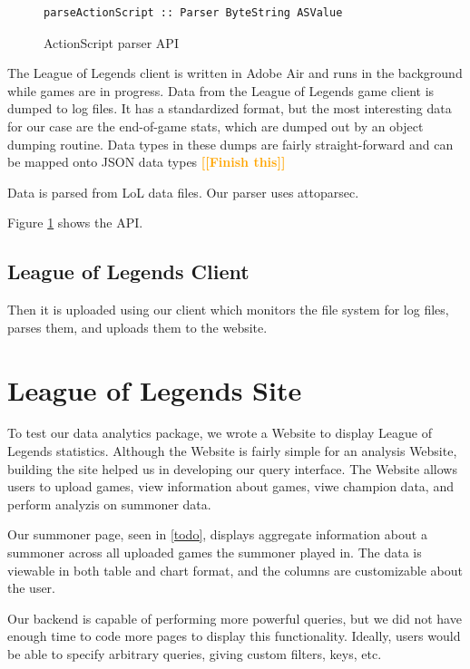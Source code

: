 \documentclass{chi2009}
\newcommand{\todo}[1]{\textsf{\textbf{\textcolor{Orange}{[[#1]]}}}}
\begin{document}
\begin{figure}[]
\begin{verbatim}
parseActionScript :: Parser ByteString ASValue
\end{verbatim}
    \caption{ActionScript parser API}
    \label{asapi}
\end{figure}

The League of Legends client is written in Adobe Air and runs in the background while games are in progress. Data from the League of Legends game client is dumped to log files.  It has a standardized format, but the most interesting data for our case are the end-of-game stats, which are dumped out by an object dumping routine.  Data types in these dumps are fairly straight-forward and can be mapped onto JSON data types \todo{Finish this}

Data is parsed from LoL data files. Our parser uses attoparsec.

Figure \ref{asapi} shows the API.

\subsection{League of Legends Client}

Then it is uploaded using our client which monitors the file system for log files, parses them, and uploads them to the website. 

\section{League of Legends Site}
\label{site}

To test our data analytics package, we wrote a Website to display League of Legends statistics. Although the Website is fairly simple for an analysis Website, building the site helped us in developing our query interface. The Website allows users to upload games, view information about games, viwe champion data, and perform analyzis on summoner data.

Our summoner page, seen in \ref{todo}, displays aggregate information about a summoner across all uploaded games the summoner played in. The data is viewable in both table and chart format, and the columns are customizable about the user.

Our backend is capable of performing more powerful queries, but we did not have enough time to code more pages to display this functionality. Ideally, users would be able to specify arbitrary queries, giving custom filters, keys, etc. 
\end{document}
